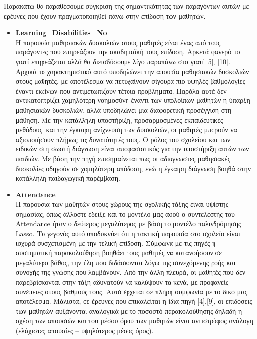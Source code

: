 \documentclass[12pt]{article}
\begin{document}
Παρακάτω θα παραθέσουμε σύγκριση της σημαντικότητας των παραγόντων αυτών με ερέυνες που έχουν πραγματοποιηθεί 
πάνω στην επίδοση των μαθητών.\\

\begin{itemize}
\item \textbf{Learning\_{Disabilities}\_{No}}\\
Η παρουσία μαθησιακών δυσκολιών στους μαθητές είναι ένας από τους παράγοντες που επηρεάζουν την ακαδημαϊκή τους επίδοση. Αρκετά φανερό το γιατί επηρεάζεται αλλά θα διεισδύσουμε λίγο παραπάνω στο γιατί [5], [10].
Αρχικά το χαρακτηριστικό αυτό υποδηλώνει την απουσία μαθησιακών δυσκολιών στους μαθητές, με αποτέλεσμα να πετυχαίνουν σίγουρα πιο υψηλές βαθμολογίες έναντι εκείνων που αντιμετωπίζουν τέτοια προβληματα.
Παρόλα αυτά δεν αντικατοπτρίζει χαμηλότερη νοημοσύνη έναντι των υπολοίπων μαθητών η ύπαρξη μαθησιακών δυσκολιών, αλλά υποδηλώνει μια διαφορετική προσέγγιση στη μάθηση. 
Με την κατάλληλη υποστήριξη, προσαρμοσμένες εκπαιδευτικές μεθόδους, και την έγκαιρη ανίχνευση των δυσκολιών, οι μαθητές μπορούν να αξιοποιήσουν πλήρως τις δυνατότητές τους. 
Ο ρόλος του σχολείου και των ειδικών στη σωστή διάγνωση είναι αποφασιστικός για την υποστήριξη αυτών των παιδιών. Με βάση την πηγή επισημαίνεται πως οι αδιάγνωστες μαθησιακές δυσκολίες οδηγούν σε 
χαμηλότερη απόδοση, ενώ η έγκαιρη διάγνωση βοηθά στην κατάλληλη παιδαγωγική παρέμβαση.

\item \textbf{Attendance}\\
Η παρουσια των μαθητών στους χώρους της σχολικής τάξης είναι υψίστης σημασίας, όπως άλλοστε έδειξε και 
το μοντέλο μας αφού ο συντελεστής του Attendance ήταν ο δεύτερος μεγαλύτερος με βάση το μοντέλο παλινδρόμησης Lasso. 
Το γεγονός αυτό υποδυκνύει ότι η τακτική παρουσία στο σχολείο είναι ισχυρά συσχετισμένη με την τελική επίδοση.
Σύμφωνα με τις πηγές η συστηματική παρακολούθηση βοηθάει τους μαθητές να κατανοήσουν σε μεγαλύτερο βάθος,
την ύλη που διδάσκονται λόγω της συνεχόμενης ροής και συνοχής της γνώσης που λαμβάνουν. Από την άλλη πλευρά,
οι μαθητές που δεν παρεβρίσκονται στην τάξη αδυνατούν να καλύψουν τα κενά, με προφανείς συνέπειες στους βαθμούς τους.
Αυτό έρχεται σε πλήρη συμφωνία με το δικό μας αποτέλεσμα. Μάλιστα, σε έρευνες που επικαλείται η ίδια πηγή [4],[9], 
οι επιδόσεις των μαθητών αυξάνονται αναλογικά με το ποσοστό παρακολούθησης δηλαδή η σχέση των απουσιών
και του μέσου όρου των μαθητών είναι αντιστρόφος ανάλογη (ελάχιστες απουσίες – υψηλότερος μέσος όρος).


\end{itemize}
\end{document}
